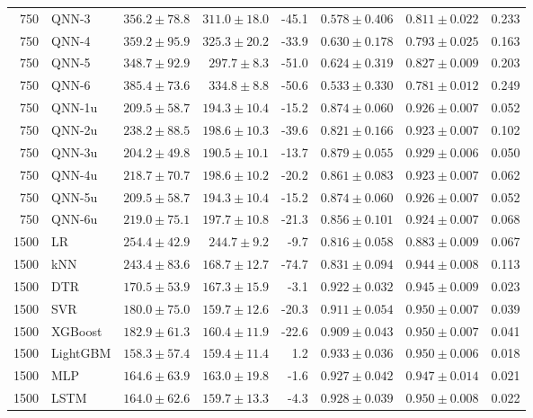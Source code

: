 \begin{longtable}{rlrrrrrr}
750 & QNN-3 & $356.2 \pm 78.8$ & $311.0 \pm 18.0$ & -45.1 & $0.578 \pm 0.406$ & $0.811 \pm 0.022$ & 0.233 \\
750 & QNN-4 & $359.2 \pm 95.9$ & $325.3 \pm 20.2$ & -33.9 & $0.630 \pm 0.178$ & $0.793 \pm 0.025$ & 0.163 \\
750 & QNN-5 & $348.7 \pm 92.9$ & $297.7 \pm 8.3$ & -51.0 & $0.624 \pm 0.319$ & $0.827 \pm 0.009$ & 0.203 \\
750 & QNN-6 & $385.4 \pm 73.6$ & $334.8 \pm 8.8$ & -50.6 & $0.533 \pm 0.330$ & $0.781 \pm 0.012$ & 0.249 \\
750 & QNN-1u & $209.5 \pm 58.7$ & $194.3 \pm 10.4$ & -15.2 & $0.874 \pm 0.060$ & $0.926 \pm 0.007$ & 0.052 \\
750 & QNN-2u & $238.2 \pm 88.5$ & $198.6 \pm 10.3$ & -39.6 & $0.821 \pm 0.166$ & $0.923 \pm 0.007$ & 0.102 \\
750 & QNN-3u & $204.2 \pm 49.8$ & $190.5 \pm 10.1$ & -13.7 & $0.879 \pm 0.055$ & $0.929 \pm 0.006$ & 0.050 \\
750 & QNN-4u & $218.7 \pm 70.7$ & $198.6 \pm 10.2$ & -20.2 & $0.861 \pm 0.083$ & $0.923 \pm 0.007$ & 0.062 \\
750 & QNN-5u & $209.5 \pm 58.7$ & $194.3 \pm 10.4$ & -15.2 & $0.874 \pm 0.060$ & $0.926 \pm 0.007$ & 0.052 \\
750 & QNN-6u & $219.0 \pm 75.1$ & $197.7 \pm 10.8$ & -21.3 & $0.856 \pm 0.101$ & $0.924 \pm 0.007$ & 0.068 \\
\midrule
1500 & LR & $254.4 \pm 42.9$ & $244.7 \pm 9.2$ & -9.7 & $0.816 \pm 0.058$ & $0.883 \pm 0.009$ & 0.067 \\
1500 & kNN & $243.4 \pm 83.6$ & $168.7 \pm 12.7$ & -74.7 & $0.831 \pm 0.094$ & $0.944 \pm 0.008$ & 0.113 \\
1500 & DTR & $170.5 \pm 53.9$ & $167.3 \pm 15.9$ & -3.1 & $0.922 \pm 0.032$ & $0.945 \pm 0.009$ & 0.023 \\
1500 & SVR & $180.0 \pm 75.0$ & $159.7 \pm 12.6$ & -20.3 & $0.911 \pm 0.054$ & $0.950 \pm 0.007$ & 0.039 \\
1500 & XGBoost & $182.9 \pm 61.3$ & $160.4 \pm 11.9$ & -22.6 & $0.909 \pm 0.043$ & $0.950 \pm 0.007$ & 0.041 \\
1500 & LightGBM & $158.3 \pm 57.4$ & $159.4 \pm 11.4$ & 1.2 & $0.933 \pm 0.036$ & $0.950 \pm 0.006$ & 0.018 \\
1500 & MLP & $164.6 \pm 63.9$ & $163.0 \pm 19.8$ & -1.6 & $0.927 \pm 0.042$ & $0.947 \pm 0.014$ & 0.021 \\
1500 & LSTM & $164.0 \pm 62.6$ & $159.7 \pm 13.3$ & -4.3 & $0.928 \pm 0.039$ & $0.950 \pm 0.008$ & 0.022 \\

\end{longtable}
